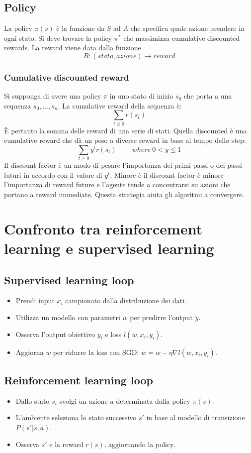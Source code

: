 \subsection{Policy}
La policy $\pi(s)$ \`e la funzione da $S$ ad $A$ che specifica quale azione prendere in ogni stato.
Si deve trovare la policy $\pi^*$ che massimizza cumulative discounted rewards.
La reward viene data dalla funzione
$$R:(stato, azione)\rightarrow reward$$

\subsubsection{Cumulative discounted reward}
Si supponga di avere una policy $\pi$ in uno stato di inizio $s_0$ che porta a una sequenza $s_0,\dots, s_n$.
La cumulative reward della sequenza \`e:
$$\sum\limits_{t\ge 0} r(s_t)$$
\`E pertanto la somma delle reward di una serie di stati.
Quella discounted \`e una cumulative reward che d\`a un peso a diverse reward in base al tempo dello step:
$$\sum\limits_{t\ge 0} y^tr(s_t)\qquad\ where\ 0 < y\le 1$$
Il discount factor \`e un modo di pesare l'importanza dei primi passi o dei passi futuri in accordo con il valore di $y^t$.
Minore \`e il discount factor \`e minore l'importanza di reward future e l'agente tende a concentrarsi su azioni che portano a reward immediate.
Questa strategia aiuta gli algoritmi a convergere.

\section{Confronto tra reinforcement learning e supervised learning}

\subsection{Supervised learning loop}
\begin{itemize}
	\item Prendi input $x_i$ campionato dalla distribuzione dei dati.
	\item Utilizza un modello con parametri $w$ per predirre l'output $y$.
	\item Osserva l'output obiettivo $y_i$ e loss $l(w, x_i, y_i)$.
	\item Aggiorna $w$ per ridurre la loss con SGD: $w = w -\eta\nabla l(w, x_i, y_i)$.
\end{itemize}

\subsection{Reinforcement learning loop}
\begin{itemize}
	\item Dallo stato $s_i$ svolgi un azione $a$ determinata dalla policy $\pi(s)$.
	\item L'ambiente seleziona lo stato successivo $s'$ in base al modello di transizione $P(s'|s,a)$.
	\item Osserva $s'$ e la reward $r(s)$, aggiornando la policy.
\end{itemize}


